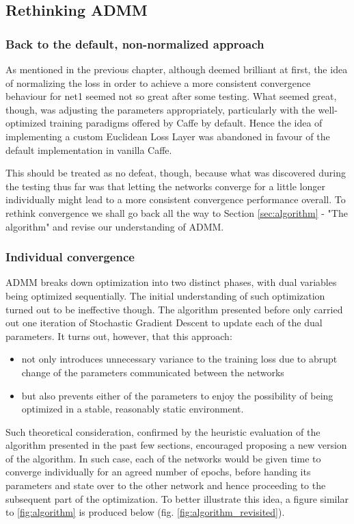 \documentclass[a4paper, 12pt]{article}
\numberwithin{equation}{section}
\begin{document}
	\subsection{Rethinking ADMM}

	\subsubsection{Back to the default, non-normalized approach}

	As mentioned in the previous chapter, although deemed brilliant at first, the idea of normalizing the loss in order to achieve a more consistent convergence behaviour for net1 seemed not so great after some testing. What seemed great, though, was adjusting the parameters appropriately, particularly with the well-optimized training paradigms offered by Caffe by default. Hence the idea of implementing a custom Euclidean Loss Layer was abandoned in favour of the default implementation in vanilla Caffe.

	This should be treated as no defeat, though, because what was discovered during the testing thus far was that letting the networks converge for a little longer individually might lead to a more consistent convergence performance overall. To rethink convergence we shall go back all the way to Section \ref{sec:algorithm} - "The algorithm" and revise our understanding of ADMM.

	\subsubsection{Individual convergence}

	ADMM breaks down optimization into two distinct phases, with dual variables being optimized sequentially. The initial understanding of such optimization turned out to be ineffective though. The algorithm presented before only carried out one iteration of Stochastic Gradient Descent to update each of the dual parameters. It turns out, however, that this approach:
	\begin{itemize}
		\item not only introduces unnecessary variance to the training loss due to abrupt change of the parameters communicated between the networks
		\item but also prevents either of the parameters to enjoy the possibility of being optimized in a stable, reasonably static environment.
	\end{itemize}

	Such theoretical consideration, confirmed by the heuristic evaluation of the algorithm presented in the past few sections, encouraged proposing a new version of the algorithm. In such case, each of the networks would be given time to converge individually for an agreed number of epochs, before handing its parameters and state over to the other network and hence proceeding to the subsequent part of the optimization. To better illustrate this idea, a figure similar to \ref{fig:algorithm} is produced below (fig. \ref{fig:algorithm_revisited}).
\end{document}
